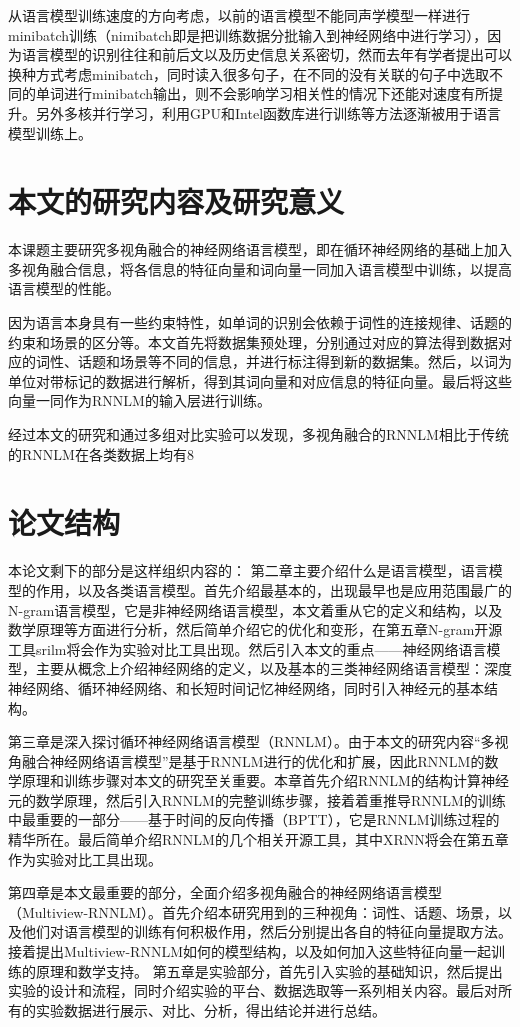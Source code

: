 从语言模型训练速度的方向考虑，以前的语言模型不能同声学模型一样进行minibatch训练（nimibatch即是把训练数据分批输入到神经网络中进行学习），因为语言模型的识别往往和前后文以及历史信息关系密切，然而去年有学者提出可以换种方式考虑minibatch，同时读入很多句子，在不同的没有关联的句子中选取不同的单词进行minibatch输出，则不会影响学习相关性的情况下还能对速度有所提升。另外多核并行学习，利用GPU和Intel函数库进行训练等方法逐渐被用于语言模型训练上。

\section{本文的研究内容及研究意义}
本课题主要研究多视角融合的神经网络语言模型，即在循环神经网络的基础上加入多视角融合信息，将各信息的特征向量和词向量一同加入语言模型中训练，以提高语言模型的性能。

因为语言本身具有一些约束特性，如单词的识别会依赖于词性的连接规律、话题的约束和场景的区分等。本文首先将数据集预处理，分别通过对应的算法得到数据对应的词性、话题和场景等不同的信息，并进行标注得到新的数据集。然后，以词为单位对带标记的数据进行解析，得到其词向量和对应信息的特征向量。最后将这些向量一同作为RNNLM的输入层进行训练。

经过本文的研究和通过多组对比实验可以发现，多视角融合的RNNLM相比于传统的RNNLM在各类数据上均有8%


\section{论文结构}
本论文剩下的部分是这样组织内容的：
第二章主要介绍什么是语言模型，语言模型的作用，以及各类语言模型。首先介绍最基本的，出现最早也是应用范围最广的N-gram语言模型，它是非神经网络语言模型，本文着重从它的定义和结构，以及数学原理等方面进行分析，然后简单介绍它的优化和变形，在第五章N-gram开源工具srilm将会作为实验对比工具出现。然后引入本文的重点——神经网络语言模型，主要从概念上介绍神经网络的定义，以及基本的三类神经网络语言模型：深度神经网络、循环神经网络、和长短时间记忆神经网络，同时引入神经元的基本结构。

第三章是深入探讨循环神经网络语言模型（RNNLM）。由于本文的研究内容“多视角融合神经网络语言模型”是基于RNNLM进行的优化和扩展，因此RNNLM的数学原理和训练步骤对本文的研究至关重要。本章首先介绍RNNLM的结构计算神经元的数学原理，然后引入RNNLM的完整训练步骤，接着着重推导RNNLM的训练中最重要的一部分——基于时间的反向传播（BPTT），它是RNNLM训练过程的精华所在。最后简单介绍RNNLM的几个相关开源工具，其中XRNN将会在第五章作为实验对比工具出现。

第四章是本文最重要的部分，全面介绍多视角融合的神经网络语言模型（Multiview-RNNLM）。首先介绍本研究用到的三种视角：词性、话题、场景，以及他们对语言模型的训练有何积极作用，然后分别提出各自的特征向量提取方法。接着提出Multiview-RNNLM如何的模型结构，以及如何加入这些特征向量一起训练的原理和数学支持。
第五章是实验部分，首先引入实验的基础知识，然后提出实验的设计和流程，同时介绍实验的平台、数据选取等一系列相关内容。最后对所有的实验数据进行展示、对比、分析，得出结论并进行总结。


